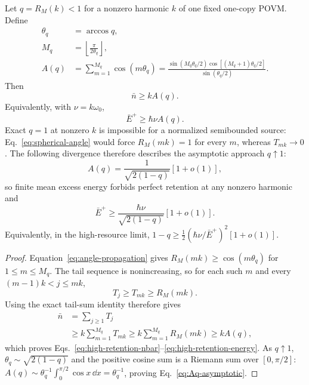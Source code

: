\begin{corollary}
\label{cor:high-retention}
Let $q=R_M(k)<1$ for a nonzero harmonic $k$ of one fixed one-copy POVM.  Define
\begin{align}
 \theta_q&=\arccos q,\\
 M_q&=\left\lfloor\frac{\pi}{2\theta_q}\right\rfloor,\\
 A(q)&=\sum_{m=1}^{M_q}\cos(m\theta_q)
 =\frac{\sin(M_q\theta_q/2)\cos[(M_q+1)\theta_q/2]}
 {\sin(\theta_q/2)}.
 \label{eq:Aq}
\end{align}
Then
\begin{equation}
 \bar n\geq k A(q).
 \label{eq:high-retention-nbar}
\end{equation}
Equivalently, with $\nu=k\omega_0$,
\begin{equation}
 \bar E^+\geq\hbar\nu A(q).
 \label{eq:high-retention-energy}
\end{equation}
Exact $q=1$ at nonzero $k$ is impossible for a normalized semibounded source: Eq.~\eqref{eq:spherical-angle} would force $R_M(mk)=1$ for every $m$, whereas $T_{mk}\to0$.  The following divergence therefore describes the asymptotic approach $q\uparrow1$:
\begin{equation}
 A(q)=\frac{1}{\sqrt{2(1-q)}}[1+o(1)],
 \label{eq:Aq-asymptotic}
\end{equation}
so finite mean excess energy forbids perfect retention at any nonzero harmonic and
\begin{equation}
 \bar E^+\geq
 \frac{\hbar\nu}{\sqrt{2(1-q)}}[1+o(1)].
 \label{eq:high-retention-divergence}
\end{equation}
Equivalently, in the high-resource limit,
$1-q\geq\tfrac12(\hbar\nu/\bar E^+)^2[1+o(1)]$.
\end{corollary}

\begin{proof}
Equation~\eqref{eq:angle-propagation} gives
$R_M(mk)\geq\cos(m\theta_q)$ for $1\leq m\leq M_q$.  The tail sequence is nonincreasing, so for each such $m$ and every
$(m-1)k<j\leq mk$,
\begin{equation}
 T_j\geq T_{mk}\geq R_M(mk).
\end{equation}
Using the exact tail-sum identity therefore gives
\begin{align}
 \bar n
 &=\sum_{j\geq1}T_j\\
 &\geq k\sum_{m=1}^{M_q}T_{mk}
 \geq k\sum_{m=1}^{M_q}R_M(mk)
 \geq kA(q),
 \label{eq:block-tail-proof}
\end{align}
which proves Eqs.~\eqref{eq:high-retention-nbar}--\eqref{eq:high-retention-energy}.  As $q\uparrow1$, $\theta_q\sim\sqrt{2(1-q)}$ and the positive cosine sum is a Riemann sum over $[0,\pi/2]$:
$A(q)\sim\theta_q^{-1}\int_0^{\pi/2}\cos x\,\dd x=\theta_q^{-1}$, proving Eq.~\eqref{eq:Aq-asymptotic}.
\end{proof}

